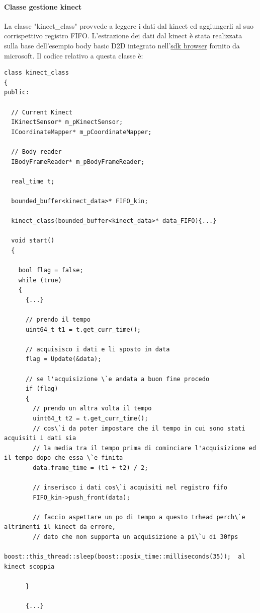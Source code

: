 \documentclass[10pt,a4paper]{article}
\begin{document}
\paragraph{Classe gestione kinect}
La classe "kinect\_class" provvede a leggere i dati dal kinect ed aggiungerli al suo corrispettivo registro FIFO. L'estrazione dei dati dal kinect \`e stata realizzata sulla base dell'esempio body basic D2D integrato nell'\href{https://www.microsoft.com/en-us/download/details.aspx?id=44561}{sdk browser} fornito da microsoft. Il codice relativo a questa classe \`e:
\begin{lstlisting}[style=mycpp, caption=classe kinect\_class, captionpos=b]
class kinect_class
{
public:

  // Current Kinect
  IKinectSensor* m_pKinectSensor;
  ICoordinateMapper* m_pCoordinateMapper;

  // Body reader
  IBodyFrameReader* m_pBodyFrameReader;

  real_time t;

  bounded_buffer<kinect_data>* FIFO_kin;

  kinect_class(bounded_buffer<kinect_data>* data_FIFO){...}

  void start()
  {
    
    bool flag = false;
    while (true)
    {
      {...}
      
      // prendo il tempo
      uint64_t t1 = t.get_curr_time();  
      
      // acquisisco i dati e li sposto in data
      flag = Update(&data);

      // se l'acquisizione \`e andata a buon fine procedo
      if (flag)
      {
        // prendo un altra volta il tempo
        uint64_t t2 = t.get_curr_time();
        // cos\`i da poter impostare che il tempo in cui sono stati acquisiti i dati sia 
        // la media tra il tempo prima di cominciare l'acquisizione ed il tempo dopo che essa \`e finita
        data.frame_time = (t1 + t2) / 2;

        // inserisco i dati cos\`i acquisiti nel registro fifo
        FIFO_kin->push_front(data);
        
        // faccio aspettare un po di tempo a questo trhead perch\`e altrimenti il kinect da errore, 
        // dato che non supporta un acquisizione a pi\`u di 30fps
        boost::this_thread::sleep(boost::posix_time::milliseconds(35));  al kinect scoppia

      }

      {...}


\end{lstlisting}
\end{document}
